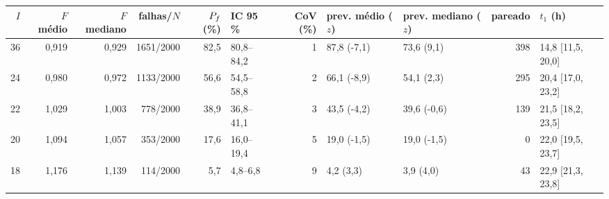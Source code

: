 \begin{tabular}{rrrrrlrllrl}
\toprule
$I$ & $F$ médio & $F$ mediano & falhas/$N$ & $P_f$ (\%) & IC 95\,\% & CoV (\%) & prev. médio ($z$) & prev. mediano ($z$) & pareado & $t_1$ (h)\\
\midrule
36 & 0{,}919 & 0{,}929 & 1651/2000 & 82{,}5 & 80{,}8--84{,}2 & 1 & 87{,}8 (-7{,}1) & 73{,}6 (9{,}1) & 398 & 14{,}8 [11{,}5, 20{,}0]\\
24 & 0{,}980 & 0{,}972 & 1133/2000 & 56{,}6 & 54{,}5--58{,}8 & 2 & 66{,}1 (-8{,}9) & 54{,}1 (2{,}3) & 295 & 20{,}4 [17{,}0, 23{,}2]\\
22 & 1{,}029 & 1{,}003 & 778/2000 & 38{,}9 & 36{,}8--41{,}1 & 3 & 43{,}5 (-4{,}2) & 39{,}6 (-0{,}6) & 139 & 21{,}5 [18{,}2, 23{,}5]\\
20 & 1{,}094 & 1{,}057 & 353/2000 & 17{,}6 & 16{,}0--19{,}4 & 5 & 19{,}0 (-1{,}5) & 19{,}0 (-1{,}5) & 0 & 22{,}0 [19{,}5, 23{,}7]\\
18 & 1{,}176 & 1{,}139 & 114/2000 & 5{,}7 & 4{,}8--6{,}8 & 9 & 4{,}2 (3{,}3) & 3{,}9 (4{,}0) & 43 & 22{,}9 [21{,}3, 23{,}8]\\
\bottomrule
\end{tabular}
